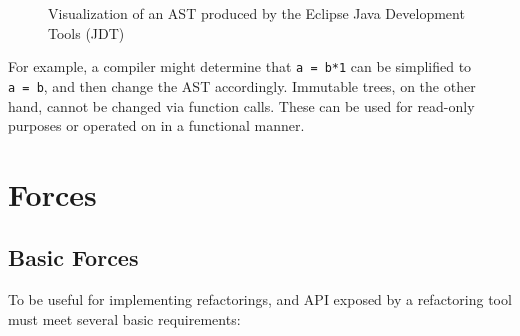 \documentclass[prodmode]{acmlarge}
\newcommand{\ttt}[1]{\texttt{#1}}
\begin{document}
\begin{figure}
\caption{Visualization of an AST produced by the Eclipse Java Development Tools
(JDT)\vspace*{-4em}}
\label{fig:jdt-ast}
\end{figure}
For example, a compiler might determine that
\ttt{a~=~b*1} can be simplified to \ttt{a~=~b}, and then change 
the AST accordingly. Immutable trees, on the other hand, cannot be changed via
function calls. These can be used for read-only purposes or operated on in a
functional manner.


\section{Forces}

\label{ss:reqs}
\subsection{Basic Forces}


To be useful for implementing refactorings, and API exposed by a refactoring 
tool must meet several basic requirements:
\end{document}
